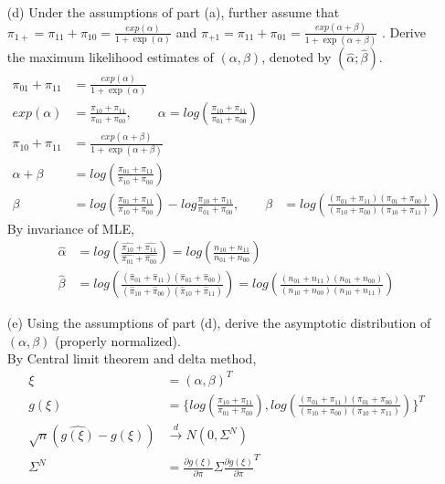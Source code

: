 \begin{itemize}
	\item[(d)] Under the assumptions of part (a), further assume that$ \pi_{1+} = \pi_{11} + \pi_{10} = \frac{exp(\alpha)}{1+\exp(\alpha)} $ and $ \pi_{+1} = \pi_{11} + \pi_{01} = \frac{exp(\alpha + \beta)}{1+\exp(\alpha + \beta)} $ . Derive the maximum likelihood estimates of $(\alpha, \beta)$, denoted by $(\hat{\alpha}; \hat{\beta})$.\\
	\begin{align*}
		\pi_{01} + \pi_{11} & = \frac{exp(\alpha)}{1+\exp(\alpha)} \\
		exp(\alpha) &= \frac{\pi_{10} + \pi_{11}}{\pi_{01} + \pi_{00}}, \qquad \alpha = log \left( \frac{\pi_{10} + \pi_{11}}{\pi_{01} + \pi_{00}}\right)\\
		\pi_{10}+ \pi_{11} & = \frac{exp(\alpha + \beta)}{1+\exp(\alpha + \beta)} \\
		\alpha + \beta &= log \left( \frac{\pi_{01} + \pi_{11}}{\pi_{10} + \pi_{00}} \right)\\
		\beta &= log \left( \frac{\pi_{01} + \pi_{11}}{\pi_{10} + \pi_{00}} \right) - log \frac{\pi_{10} + \pi_{11}}{\pi_{01} + \pi_{00}}, \qquad \beta &= log \left(\frac{(\pi_{01} + \pi_{11})(\pi_{01} + \pi_{00})}{(\pi_{10} + \pi_{00}) (\pi_{10} + \pi_{11})} \right)
	\end{align*}
	By invariance of MLE,
	\begin{align*}
		\hat\alpha &= log \left( \frac{\hat{\pi_{10}} + \hat{\pi_{11}}}{\hat{\pi_{01}} + \hat{\pi_{00}}}\right) = log \left(\frac{n_{10} + n_{11}}{n_{01} + n_{00}} \right)\\
		\hat\beta &= log \left(\frac{(\hat\pi_{01} + \hat\pi_{11})(\hat\pi_{01} + \hat\pi_{00})}{(\hat\pi_{10} + \hat\pi_{00}) (\hat\pi_{10} + \hat\pi_{11})} \right) = log \left(\frac{(n_{01} + n_{11})(n_{01} + n_{00})}{(n_{10} + n_{00}) (n_{10} + n_{11})} \right)
	\end{align*}
	\item[(e)] Using the assumptions of part (d), derive the asymptotic distribution of $(\alpha, \beta)$ (properly normalized).\\
	By Central limit theorem and delta method,
	\begin{align*}
		\xi &= (\alpha, \beta)^T \\
		g(\xi) &= \{ log \left( \frac{\pi_{10} + \pi_{11}}{\pi_{01} + \pi_{00}}\right), log \left(\frac{(\pi_{01} + \pi_{11})(\pi_{01} + \pi_{00})}{(\pi_{10} + \pi_{00}) (\pi_{10} + \pi_{11})} \right)\}^T \\
		\sqrt{n} (\hat{g(\xi)} - g(\xi)) & \xrightarrow[]{d} N \left(0, \Sigma^{N} \right) \\
		\Sigma^{N} &= \frac{\partial g(\xi)}{\partial \pi} \Sigma \frac{\partial g(\xi)}{\partial \pi}^T
	\end{align*}
	

\end{itemize}
